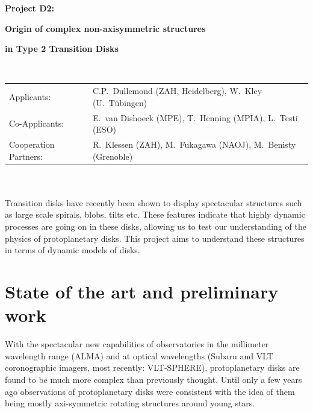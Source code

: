 \documentclass[10pt,fleqn,twoside,a4paper]{article}
\begin{document}
\newpage


\setcounter{page}{159}

\centerline{\huge\bf\Tcol
%
%
%
%
%
 Project D2:}
\vspace{1em}

\centerline{\LARGE\bf\Tcol Origin of complex non-axisymmetric structures}\vspace{0.3em}
\centerline{\LARGE\bf\Tcol in Type 2 Transition Disks}

%
%
%
%
%
\vskip1.0cm


\\
\begin{tabular}{ll}
{\textsf{Applicants:}}              & C.P.~Dullemond (ZAH, Heidelberg), W.~Kley (U.~T\"ubingen)\\
{\textsf{Co-Applicants:}}           & E.~van Dishoeck (MPE), T.~Henning (MPIA), L.~Testi (ESO)\\
{\textsf{Cooperation Partners:}}    & R.~Klessen (ZAH), M.~Fukagawa (NAOJ), M.~Benisty (Grenoble)\\
\end{tabular}


\vspace{1em}
 \\

\vspace{1em}
\\
Transition disks have recently been shown to display spectacular structures
such as large scale spirals, blobs, tilts etc. These features indicate that
highly dynamic processes are going on in these disks, allowing us to test
our understanding of the physics of protoplanetary disks. This project aims
to understand these structures in terms of dynamic models of disks.


\section{State of the art and preliminary work}
\renewcommand{\leftmark}{\sc State of the Art and preliminary work}
With the spectacular new capabilities of observatories in the millimeter
wavelength range (ALMA) and at optical wavelengths (Subaru and VLT
coronographic imagers, most recently: VLT-SPHERE), protoplanetary disks are
found to be much more complex than previously thought. Until only a few
years ago observations of protoplanetary disks were consistent with the idea
of them being mostly axi-symmetric rotating structures around young stars.  
\end{document}

